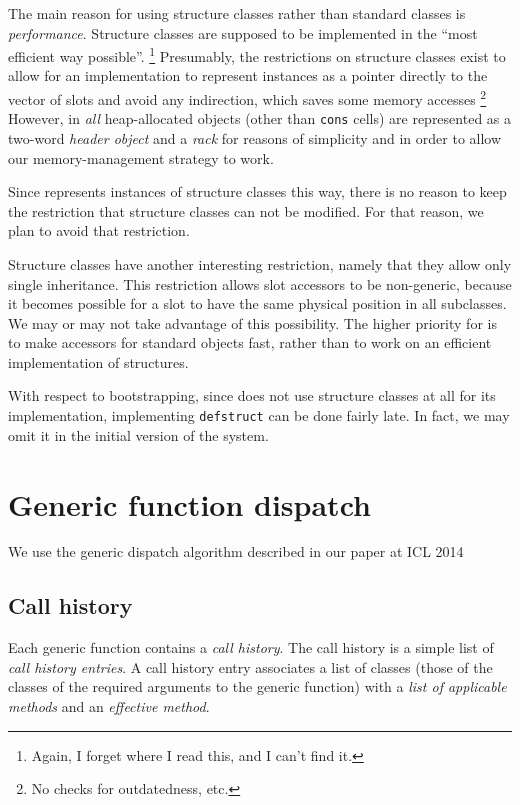 The main reason for using structure classes rather than standard
classes is \emph{performance}.  Structure classes are supposed to be
implemented in the ``most efficient way possible''.%
\footnote{Again, I forget where I read this, and I can't find it.}
Presumably, the restrictions on structure classes exist to allow for
an implementation to represent instances as a pointer directly to the
vector of slots and avoid any indirection, which saves some memory
accesses%
\footnote{No checks for outdatedness, etc.}
However, in \sysname{} \emph{all} heap-allocated objects
(other than \texttt{cons} cells) are represented as a two-word
\emph{header object} and a \emph{rack} for reasons of
simplicity and in order to allow our memory-management strategy to
work.

Since \sysname{} represents instances of structure classes this way,
there is no reason to keep the restriction that structure classes can
not be modified.  For that reason, we plan to avoid that restriction.

Structure classes have another interesting restriction, namely that
they allow only single inheritance.  This restriction allows slot
accessors to be non-generic, because it becomes possible for a slot to
have the same physical position in all subclasses.  We may or may not
take advantage of this possibility.  The higher priority for
\sysname{} is to make accessors for standard objects fast, rather than
to work on an efficient implementation of structures. 

With respect to bootstrapping, since \sysname{} does not use structure
classes at all for its implementation, implementing \texttt{defstruct}
can be done fairly late.  In fact, we may omit it in the initial version
of the system. 

\section{Generic function dispatch}
\label{sec-generic-function-dispatch}

We use the generic dispatch algorithm described in our paper at ICL
2014 \cite{Strandh:2014:FGD:2635648.2635654}

\subsection{Call history}
\label{sec-generic-function-dispatch-call-history}

Each generic function contains a \emph{call history}.  The call
history is a simple list of \emph{call history entries}.  A call
history entry associates a list of classes (those of the classes of
the required arguments to the generic function) with a \emph{list of
  applicable methods} and an \emph{effective method}.

